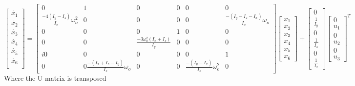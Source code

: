 \documentclass{article}
\begin{document}
\begin{equation}
    \begin{bmatrix}
    \dot{x_1}  \\
    \dot{x_2}  \\
    \dot{x_3}  \\
    \dot{x_4}  \\
    \dot{x_5}  \\
    \dot{x_6}  \\
  \end{bmatrix}
  =
  \begin{bmatrix}
    0 & 1  & 0 & 0 & 0 & 0 \\
    \frac{-4(I_y - I_z)}{I_x} \omega^{2}_{o} & 0 & 0 & 0 & 0 & \frac{-(I_y-I_z-I_x)}{I_x} \omega_o \\
    0 & 0  & 0 & 1 & 0 & 0 \\
    0 & 0 & \frac{-3\omega^{2}_{0}(I_{x} + I_{z})}{I_y} & 0 & 0 & 0 \\i
    0 & 0  & 0 & 0 & 0 & 1 \\
    0 & 0 \frac{-(I_x + I_z - I_y)}{I_z} \omega_o & 0 & 0 & \frac{-(I_y - I_x)}{I_z} \omega^{2}_{o} & 0
    \end{bmatrix}
    \begin{bmatrix}
      {x_1}  \\
      {x_2}  \\
      {x_3}  \\
      {x_4}  \\
      {x_5}  \\
      {x_6}
    \end{bmatrix}
  +
    \begin{bmatrix}
        0 \\
        \frac{1}{I_y}\\
        0 \\
        \frac{1}{I_x}\\
        0\\
        \frac{1}{I_z}
    \end{bmatrix}
    \begin{bmatrix}
      0 \\
      u_1\\
      0 \\
      u_2\\
      0\\
      u_3
    \end{bmatrix}^T
\end{equation}
Where the U matrix is transposed
\end{document}
